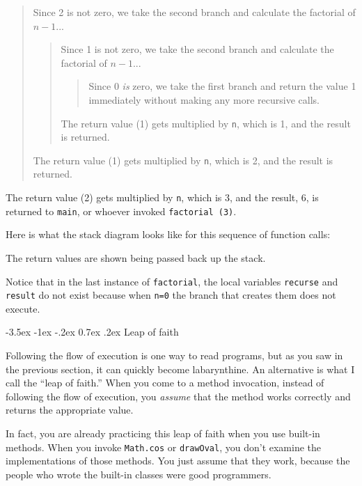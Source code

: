 \documentclass{book}
\makeatletter
\renewcommand{\section}{\@startsection 
    {section} {1} {0mm}%
    {-3.5ex \@plus -1ex \@minus -.2ex}%
    {0.7ex \@plus.2ex}%
    {\normalfont\Large\bfseries}}
\newcommand{\beforefig}{\vspace{1.3\parskip}}
\newcommand{\afterfig}{\vspace{-0.2\parskip}}
\newcommand{\myfig}[1]{
    \beforefig
    \centerline{\epsfig{#1,scale=0.8}}
    \afterfig
}
\makeatother
\begin{document}
\begin{quote}
Since 2 is not zero, we take the second branch and calculate
the factorial of $n-1$...

\begin{quote}
Since 1 is not zero, we take the second branch and calculate
the factorial of $n-1$...

\begin{quote}
Since 0 {\em is} zero, we take the first branch and return
the value 1 immediately without making any more recursive
calls.

\end{quote}

The return value (1) gets multiplied by {\tt n}, which is 1,
and the result is returned.

\end{quote}

The return value (1) gets multiplied by {\tt n}, which is 2,
and the result is returned.

\end{quote}

\noindent The return value (2) gets multiplied by {\tt n}, which is 3,
and the result, 6, is returned to {\tt main}, or whoever
invoked {\tt factorial (3)}.


Here is what the stack diagram looks like for this sequence of
function calls:


\myfig{figure=figs/stack3.eps}

%
The return values are shown being passed back up the stack.

Notice that in the last instance of {\tt factorial}, the local
variables {\tt recurse} and {\tt result} do not exist because
when {\tt n=0} the branch that creates them does not execute.


\section{Leap of faith}

Following the flow of execution is one way to read programs, but as
you saw in the previous section, it can quickly become labarynthine.
An alternative is what I call the ``leap of faith.''  When you come to
a method invocation, instead of following the flow of execution, you
{\em assume} that the method works correctly and returns the
appropriate value.

In fact, you are already practicing this leap of faith
when you use built-in methods.  When you invoke {\tt Math.cos}
or {\tt drawOval}, you don't examine the implementations of 
those methods.  You just assume that they work, because the people
who wrote the built-in classes were good programmers.
\end{document}
